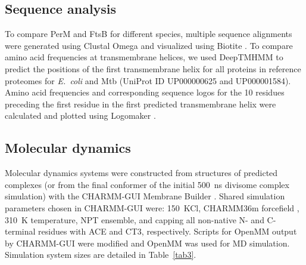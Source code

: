 \documentclass[twocolumn,pdflatex,sn-nature]{sn-jnl}%
\newcommand\ec{\textit{E.~coli}}
\newcommand\mtb{Mtb}
\begin{document}
\subsection{Sequence analysis}

To compare PerM and FtsB for different species, multiple sequence alignments were generated using Clustal Omega \citep{sieversFastScalableGeneration2011} and visualized using Biotite \citep{kunzmannBiotiteUnifyingOpen2018}. To compare amino acid frequencies at transmembrane helices, we used DeepTMHMM \citep{hallgrenDeepTMHMMPredictsAlpha2022} to predict the positions of the first transmembrane helix for all proteins in reference proteomes for \ec{} and \mtb{} (UniProt ID UP000000625 and UP000001584). Amino acid frequencies and corresponding sequence logos for the 10 residues preceding the first residue in the first predicted transmembrane helix were calculated and plotted using Logomaker \citep{tareenLogomakerBeautifulSequence2020}.

\subsection{Molecular dynamics}

Molecular dynamics systems were constructed from structures of predicted complexes (or from the final conformer of the initial \qty{500}{\ns} divisome complex simulation) with the CHARMM-GUI Membrane Builder \citep{wuCHARMMGUIMembraneBuilder2014}.
Shared simulation parameters chosen in CHARMM-GUI were: \qty{150}{\mM}~KCl, CHARMM36m forcefield \citep{huangCHARMM36mImprovedForce2017}, \qty{310}{K} temperature, NPT ensemble, and capping all non-native N- and C-terminal residues with ACE and CT3, respectively.
Scripts for OpenMM \cite{eastmanOpenMMRapidDevelopment2017} output by CHARMM-GUI were modified and OpenMM was used for MD simulation. Simulation system sizes are detailed in Table~\ref{tab3}.
\end{document}

